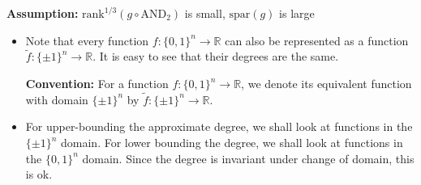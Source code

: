 \begin{frame}
	\textbf{Assumption: }$\text{rank}^{1/3} (g \circ \text{AND}_2)$ is small, $\text{spar}(g)$ is large
	
	\begin{itemize}
		\item<1-> Note that every function $f: \{0,1\}^n \rightarrow \mathbb{R}$ can also be represented as a function $\tilde{f}: \{ \pm 1\}^n \rightarrow \mathbb{R}$. It is easy to see that their degrees are the same. \newline
		
		 \textbf{Convention: }For a function $f: \{0,1\}^n \rightarrow \mathbb{R}$, we denote its equivalent function with domain $\{ \pm 1\}^n$ by $\tilde{f}: \{ \pm 1\}^n \rightarrow \mathbb{R}$.
		\item<2-> For upper-bounding the approximate degree, we shall look at functions in the $\{\pm 1\}^n$ domain. For lower bounding the degree, we shall look at functions in the $\{ 0, 1\}^n$ domain. Since the degree is invariant under change of domain, this is ok.
	\end{itemize}
	
\end{frame}


